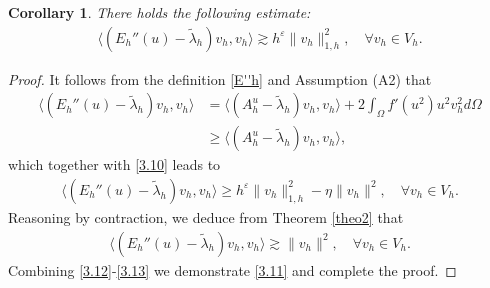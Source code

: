 \documentclass[compress, preprint,9pt]{elsarticle}
\numberwithin{equation}{section}
\newtheorem{coro}{Corollary}[section]
\newcommand{\eps}{\varepsilon}
\newcommand{\la}{\langle}
\newcommand{\ran}{\rangle}
\begin{document}

\begin{coro}
	There holds the following estimate:
	\begin{eqnarray}\label{3.11}
		\la (E_h''(u)-\widetilde{\lambda}_h)v_h,v_h\ran\gtrsim h^\eps\|v_h\|_{1,h}^2,\quad\forall v_h\in V_h.
	\end{eqnarray}
\end{coro}
\begin{proof}
	It follows from the definition \eqref{E''h} and Assumption (A2) that
	\begin{eqnarray*}
		\la (E_h''(u)-\widetilde{\lambda}_h)v_h,v_h\ran&=\la (A_h^u-\widetilde{\lambda}_h)v_h,v_h\ran+2\int_\Omega f'(u^2)u^2v_h^2 d\Omega\\
		&\ge\la (A_h^u-\widetilde{\lambda}_h)v_h,v_h\ran,
	\end{eqnarray*}
	which together with \eqref{3.10} leads to
	\begin{eqnarray}\label{3.12}
		\la (E_h''(u)-\widetilde{\lambda}_h)v_h,v_h\ran \ge h^\eps\|v_h\|_{1,h}^2-\eta\|v_h\|^2,\quad\forall v_h\in V_h.
	\end{eqnarray}
	Reasoning by contraction, we deduce from Theorem \ref{theo2} that
	\begin{eqnarray}\label{3.13}
		\la (E_h''(u)-\widetilde{\lambda}_h)v_h,v_h\ran\gtrsim \|v_h\|^2,\quad\forall v_h\in V_h.
	\end{eqnarray}
	Combining \eqref{3.12}-\eqref{3.13} we demonstrate \eqref{3.11} and complete the proof.
\end{proof}
\end{document}
